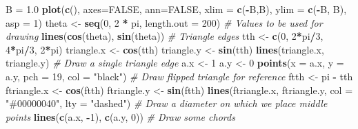 \documentclass[
]{article}
\newenvironment{Shaded}{\begin{snugshade}}{\end{snugshade}}
\newcommand{\AttributeTok}[1]{\textcolor[rgb]{0.13,0.29,0.53}{#1}}
\newcommand{\CommentTok}[1]{\textcolor[rgb]{0.56,0.35,0.01}{\textit{#1}}}
\newcommand{\ConstantTok}[1]{\textcolor[rgb]{0.56,0.35,0.01}{#1}}
\newcommand{\DecValTok}[1]{\textcolor[rgb]{0.00,0.00,0.81}{#1}}
\newcommand{\FloatTok}[1]{\textcolor[rgb]{0.00,0.00,0.81}{#1}}
\newcommand{\FunctionTok}[1]{\textcolor[rgb]{0.13,0.29,0.53}{\textbf{#1}}}
\newcommand{\NormalTok}[1]{#1}
\newcommand{\OtherTok}[1]{\textcolor[rgb]{0.56,0.35,0.01}{#1}}
\newcommand{\SpecialCharTok}[1]{\textcolor[rgb]{0.81,0.36,0.00}{\textbf{#1}}}
\newcommand{\StringTok}[1]{\textcolor[rgb]{0.31,0.60,0.02}{#1}}
\begin{document}
\begin{Shaded}
\begin{Highlighting}[]
\NormalTok{B }\OtherTok{=} \FloatTok{1.0}
\FunctionTok{plot}\NormalTok{(}\FunctionTok{c}\NormalTok{(), }\AttributeTok{axes=}\ConstantTok{FALSE}\NormalTok{, }\AttributeTok{ann=}\ConstantTok{FALSE}\NormalTok{, }\AttributeTok{xlim =} \FunctionTok{c}\NormalTok{(}\SpecialCharTok{{-}}\NormalTok{B,B), }\AttributeTok{ylim  =} \FunctionTok{c}\NormalTok{(}\SpecialCharTok{{-}}\NormalTok{B, B), }\AttributeTok{asp =} \DecValTok{1}\NormalTok{)}
\NormalTok{theta }\OtherTok{\textless{}{-}} \FunctionTok{seq}\NormalTok{(}\DecValTok{0}\NormalTok{, }\DecValTok{2} \SpecialCharTok{*}\NormalTok{ pi, }\AttributeTok{length.out =} \DecValTok{200}\NormalTok{) }\CommentTok{\# Values to be used for drawing}
\FunctionTok{lines}\NormalTok{(}\FunctionTok{cos}\NormalTok{(theta), }\FunctionTok{sin}\NormalTok{(theta))}
\CommentTok{\# Triangle edges}
\NormalTok{tth }\OtherTok{\textless{}{-}} \FunctionTok{c}\NormalTok{(}\DecValTok{0}\NormalTok{, }\DecValTok{2}\SpecialCharTok{*}\NormalTok{pi}\SpecialCharTok{/}\DecValTok{3}\NormalTok{, }\DecValTok{4}\SpecialCharTok{*}\NormalTok{pi}\SpecialCharTok{/}\DecValTok{3}\NormalTok{, }\DecValTok{2}\SpecialCharTok{*}\NormalTok{pi)}
\NormalTok{triangle.x }\OtherTok{\textless{}{-}} \FunctionTok{cos}\NormalTok{(tth)}
\NormalTok{triangle.y }\OtherTok{\textless{}{-}} \FunctionTok{sin}\NormalTok{(tth)}
\FunctionTok{lines}\NormalTok{(triangle.x, triangle.y)}
\CommentTok{\# Draw a single triangle edge}
\NormalTok{a.x }\OtherTok{\textless{}{-}} \DecValTok{1}
\NormalTok{a.y }\OtherTok{\textless{}{-}} \DecValTok{0}
\FunctionTok{points}\NormalTok{(}\AttributeTok{x =}\NormalTok{ a.x, }\AttributeTok{y =}\NormalTok{ a.y, }\AttributeTok{pch =} \DecValTok{19}\NormalTok{, }\AttributeTok{col =} \StringTok{"black"}\NormalTok{)}
\CommentTok{\# Draw flipped triangle for reference}
\NormalTok{ftth }\OtherTok{\textless{}{-}}\NormalTok{ pi }\SpecialCharTok{{-}}\NormalTok{ tth}
\NormalTok{ftriangle.x }\OtherTok{\textless{}{-}} \FunctionTok{cos}\NormalTok{(ftth)}
\NormalTok{ftriangle.y }\OtherTok{\textless{}{-}} \FunctionTok{sin}\NormalTok{(ftth)}
\FunctionTok{lines}\NormalTok{(ftriangle.x, ftriangle.y, }\AttributeTok{col =} \StringTok{"\#00000040"}\NormalTok{, }\AttributeTok{lty =} \StringTok{"dashed"}\NormalTok{)}
\CommentTok{\# Draw a diameter on which we place middle points}
\FunctionTok{lines}\NormalTok{(}\FunctionTok{c}\NormalTok{(a.x, }\SpecialCharTok{{-}}\DecValTok{1}\NormalTok{), }\FunctionTok{c}\NormalTok{(a.y, }\DecValTok{0}\NormalTok{))}
\CommentTok{\# Draw some chords}

\end{Highlighting}
\end{Shaded}
\end{document}

